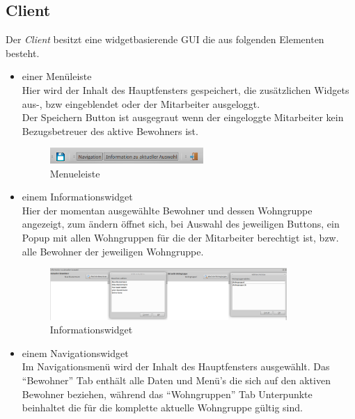\subsection{\EBP Client}
Der \EBP \textit{Client} besitzt eine widgetbasierende GUI die aus folgenden Elementen besteht.
\begin{itemize}
	\item einer Menüleiste\mbox{}\\
	\noindent
	Hier wird der Inhalt des Hauptfensters gespeichert, die zusätzlichen Widgets aus-, bzw eingeblendet oder der Mitarbeiter ausgeloggt.\\ Der Speichern Button ist ausgegraut wenn der eingeloggte Mitarbeiter kein Bezugsbetreuer des aktive Bewohners ist.
	\begin{figure}[h]
		\begin{center}
			\includegraphics[keepaspectratio=true, width=0.55\textwidth]{pics/client_header.png}
			\caption{Menueleiste}
		\end{center}
	\end{figure}
	\FloatBarrier
	\noindent
	\item einem Informationswidget\mbox{}\\
	Hier der momentan ausgewählte Bewohner und dessen Wohngruppe angezeigt, zum ändern öffnet sich, bei Auswahl des jeweiligen Buttons, ein Popup mit allen Wohngruppen für die der Mitarbeiter berechtigt ist, bzw. alle Bewohner der jeweiligen Wohngruppe.
	\begin{figure}[h]
		\begin{center}
			\includegraphics[keepaspectratio=true, width=0.85\textwidth]{pics/client_info.png}
			\caption{Informationswidget}
		\end{center}
	\end{figure}
	\FloatBarrier
	\newpage
	\item einem Navigationswidget\mbox{}\\
	\noindent
	Im Navigationsmenü wird der Inhalt des Hauptfensters ausgewählt. Das ``Bewohner'' Tab enthält alle Daten und Menü's die sich auf den aktiven Bewohner beziehen, während das ``Wohngruppen'' Tab Unterpunkte beinhaltet die für die komplette aktuelle Wohngruppe gültig sind.	

\end{itemize}

